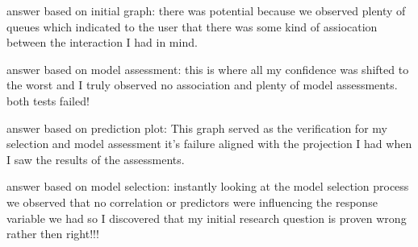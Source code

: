 \documentclass[
]{article}
\begin{document}
answer based on initial graph: there was potential because we observed
plenty of queues which indicated to the user that there was some kind of
assiocation between the interaction I had in mind.

answer based on model assessment: this is where all my confidence was
shifted to the worst and I truly observed no association and plenty of
model assessments. both tests failed!

answer based on prediction plot: This graph served as the verification
for my selection and model assessment it's failure aligned with the
projection I had when I saw the results of the assessments.

answer based on model selection: instantly looking at the model
selection process we observed that no correlation or predictors were
influencing the response variable we had so I discovered that my initial
research question is proven wrong rather then right!!!
\end{document}
